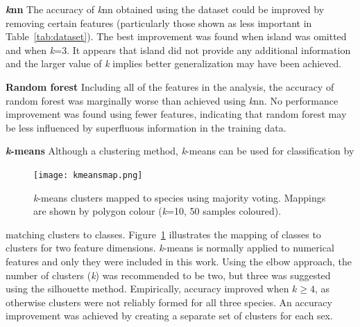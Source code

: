 \documentclass[a4paper, 11pt]{article}
\begin{document}
\textbf{\textit{k}nn}  
The accuracy of \textit{k}nn obtained using the dataset could be improved by removing certain features 
(particularly those shown as less important in Table~\ref{tab:dataset}).
The best improvement was found when island was omitted and when \textit{k}=3. It appears that island did not provide 
any additional information and the larger value of \textit{k} implies better generalization may have been achieved.

\textbf{Random forest}  
Including all of the features in the analysis, the accuracy of random forest was marginally worse 
than achieved using \textit{k}nn. 
No performance improvement was found using fewer features, indicating that random forest
may be less influenced by superfluous information in the training data. 

\textbf{\textit{k}-means} Although a clustering method, 
\textit{k}-means can be used for classification by 
\begin{figure} %
  \centering
  \vspace{0\baselineskip} %
  \texttt{[image: kmeansmap.png]} %
  \vspace{-0.5\baselineskip} %
  \caption{\centering\linespread{0.8}\selectfont \textit{k}-means clusters mapped to species using majority voting. 
  Mappings are shown by polygon colour (\textit{k}=10, 50 samples coloured).}
  \vspace{-1\baselineskip} %
  \label{fig:kmeansmap}
\end{figure}
matching clusters to classes. 
Figure~\ref{fig:kmeansmap} illustrates the mapping of classes to clusters for two feature dimensions.
\textit{k}-means is normally applied to numerical features and only they were included in this work. 
Using the elbow approach, the number of clusters (\textit{k}) was recommended to be two, but three was suggested 
using the silhouette method. Empirically, accuracy improved when \(k \geq 4\),
as otherwise clusters were not reliably formed for all three species.   
An accuracy improvement was achieved by creating a separate set of clusters for each sex.
\end{document}
